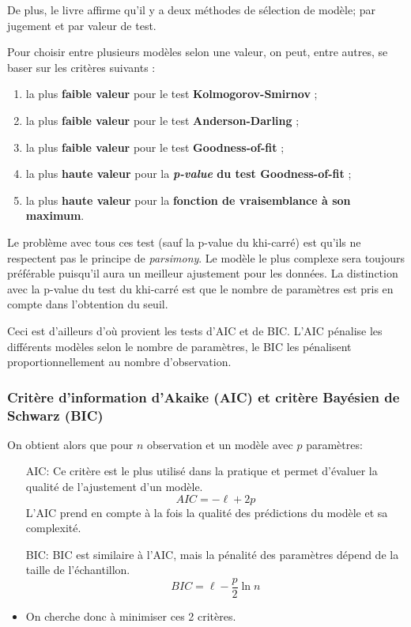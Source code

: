 \documentclass[10pt, french]{article}
\begin{document}
\begin{multicols*}{3}
De plus, le livre affirme qu'il y a deux méthodes de sélection de modèle; par jugement et par valeur de test.

Pour choisir entre plusieurs modèles selon une valeur, on peut, entre autres, se baser sur les critères suivants : 
\begin{enumerate}
\item la plus \textbf{faible valeur} pour le test \textbf{Kolmogorov-Smirnov} ; 
\item la plus \textbf{faible valeur} pour le test \textbf{Anderson-Darling} ;
\item la plus \textbf{faible valeur} pour le test \textbf{Goodness-of-fit} ;
\item la plus \textbf{haute valeur} pour la \textbf{\emph{p-value} du test Goodness-of-fit} ; 
\item la plus \textbf{haute valeur} pour la \textbf{fonction de vraisemblance à son maximum}.
\end{enumerate}

Le problème avec tous ces test (sauf la p-value du khi-carré) est qu'ils ne respectent pas le principe de \textit{parsimony}. 
Le modèle le plus complexe sera toujours préférable puisqu'il aura un meilleur ajustement pour les données.
La distinction avec la p-value du test du khi-carré est que le nombre de paramètres est pris en compte dans l'obtention du seuil.

Ceci est d'ailleurs d'où provient les tests d'AIC et de BIC. L'AIC pénalise les différents modèles selon le nombre de paramètres, le BIC les pénalisent proportionnellement au nombre d'observation.

\subsubsection*{Critère d'information d'Akaike (AIC) et critère Bayésien de Schwarz (BIC)}
On obtient alors que pour $n$ observation et un modèle avec $p$ paramètres:
\begin{itemize}
\item[AIC:] Ce critère est le plus utilisé dans la pratique et permet d'évaluer la qualité de l'ajustement d'un modèle. 
	\[ 
		AIC = - \ell + 2 p
	\]
L'AIC prend en compte à la fois la qualité des prédictions du modèle et sa complexité.
\item[BIC:] BIC est similaire à l'AIC, mais la pénalité des paramètres dépend de la taille de l'échantillon.
	\[ 
		BIC = \ell - \frac{p}{2} \ln n
	\]
\item On cherche donc à minimiser ces 2 critères.
\end{itemize}


\end{multicols*}
\end{document}
